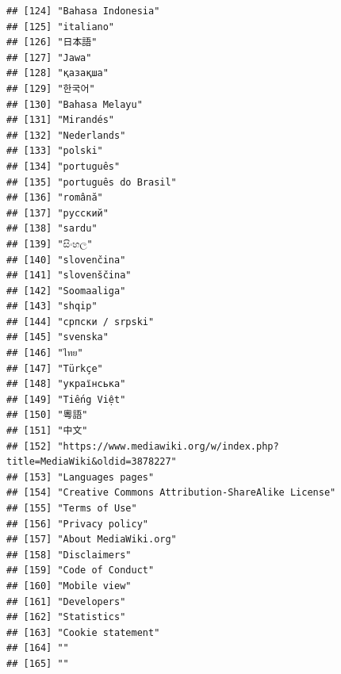 \documentclass[
]{article}
\begin{document}
\begin{verbatim}
## [124] "Bahasa Indonesia"                                                   
## [125] "italiano"                                                           
## [126] "日本語"                                                             
## [127] "Jawa"                                                               
## [128] "қазақша"                                                            
## [129] "한국어"                                                             
## [130] "Bahasa Melayu"                                                      
## [131] "Mirandés"                                                           
## [132] "Nederlands"                                                         
## [133] "polski"                                                             
## [134] "português"                                                          
## [135] "português do Brasil"                                                
## [136] "română"                                                             
## [137] "русский"                                                            
## [138] "sardu"                                                              
## [139] "සිංහල"                                                               
## [140] "slovenčina"                                                         
## [141] "slovenščina"                                                        
## [142] "Soomaaliga"                                                         
## [143] "shqip"                                                              
## [144] "српски / srpski"                                                    
## [145] "svenska"                                                            
## [146] "ไทย"                                                                
## [147] "Türkçe"                                                             
## [148] "українська"                                                         
## [149] "Tiếng Việt"                                                         
## [150] "粵語"                                                               
## [151] "中文"                                                               
## [152] "https://www.mediawiki.org/w/index.php?title=MediaWiki&oldid=3878227"
## [153] "Languages pages"                                                    
## [154] "Creative Commons Attribution-ShareAlike License"                    
## [155] "Terms of Use"                                                       
## [156] "Privacy policy"                                                     
## [157] "About MediaWiki.org"                                                
## [158] "Disclaimers"                                                        
## [159] "Code of Conduct"                                                    
## [160] "Mobile view"                                                        
## [161] "Developers"                                                         
## [162] "Statistics"                                                         
## [163] "Cookie statement"                                                   
## [164] ""                                                                   
## [165] ""
\end{verbatim}
\end{document}
